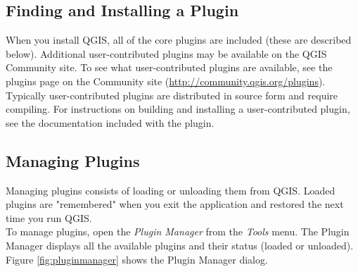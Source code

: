 \documentclass[10pt,english]{article}
\begin{document}
\begin{onehalfspace}
\subsection{Finding and Installing a Plugin}
When you install QGIS, all of the core plugins are included (these are described
below). Additional user-contributed plugins may be
available on the QGIS Community site. To see what user-contributed plugins are
available, see the plugins page on the Community site
(\url{http://community.qgis.org/plugins}).\\

Typically user-contributed plugins are distributed in source form and require compiling. For instructions on building and installing a user-contributed plugin, see the documentation included with the plugin.
\subsection{Managing Plugins}\label{sec:managing_plugins}
Managing plugins consists of loading or unloading them from QGIS. Loaded plugins are "remembered" when you exit the application and restored the next time you run QGIS.\\

To manage plugins, open the \textsl{Plugin Manager} from the \textsl{Tools}
menu. The Plugin Manager displays all the available plugins and their status (loaded or unloaded). Figure \ref{fig:pluginmanager} shows the Plugin Manager dialog.


\end{onehalfspace}
\end{document}
